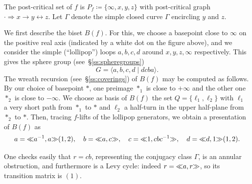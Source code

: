 \documentclass{amsart}
\begin{document}
\begin{center}
\end{center}
The post-critical set of $f$ is $P_f\coloneqq\{\infty,x,y,z\}$ with
post-critical graph $\cdot\Rightarrow x\to y\leftrightarrow z$. Let
$\Gamma$ denote the simple closed curve $\Gamma$ encircling $y$ and
$z$.

We first describe the biset $B(f)$. For this, we choose a basepoint
close to $\infty$ on the positive real axis (indicated by a white dot on
the figure above), and we consider the simple (``lollipop'') loops
$a,b,c,d$ around $x,y,z,\infty$ respectively. This gives the sphere
group (see~\S\ref{ss:spheregroups})
\[G=\langle a,b,c,d\mid d c b a\rangle.\] The wreath recursion
(see~\S\ref{ss:coverings}) of $B(f)$ may be computed as follows. By
our choice of basepoint $*$, one preimage $*_1$ is close to $+\infty$
and the other one $*_2$ is close to $-\infty$. We choose as basis of
$B(f)$ the set $Q=\{\ell_1,\ell_2\}$ with $\ell_1$ a very short path
from $*_1$ to $*$ and $\ell_2$ a half-turn in the upper half-plane
from $*_2$ to $*$. Then, tracing $f$-lifts of the lollipop generators,
we obtain a presentation of $B(f)$ as
\[a={\ll}a^{-1},a{\gg}(1,2),\quad b={\ll}a,c{\gg},\quad c={\ll}1,c b c^{-1}{\gg},\quad d={\ll}d,1{\gg}(1,2).
\]

One checks easily that $r=c b$, representing the conjugacy class
$\Gamma$, is an annular obstruction, and furthermore is a Levy cycle:
indeed $r={\ll}a,r{\gg}$, so its transition matrix is $(1)$.
\end{document}
